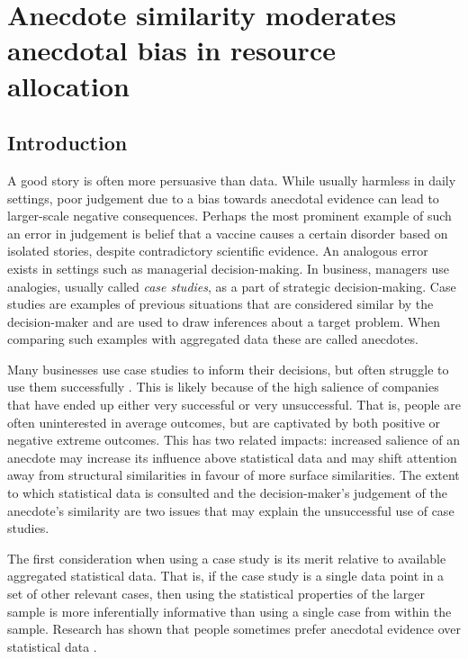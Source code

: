 \documentclass[a4paper, nobind, dvipsnames]{templates/ociamthesis}
\theoremstyle{definition}
\theoremstyle{definition}
\theoremstyle{definition}
\theoremstyle{definition}
\theoremstyle{remark}
\begin{document}
\hypertarget{anecdotes}{%
\chapter{Anecdote similarity moderates anecdotal bias in resource allocation}\label{anecdotes}}

\minitoc

\section{Introduction}

A good story is often more persuasive than data. While usually harmless in daily
settings, poor judgement due to a bias towards anecdotal evidence can lead to
larger-scale negative consequences. Perhaps the most prominent example of such
an error in judgement is belief that a vaccine causes a certain disorder based
on isolated stories, despite contradictory scientific evidence. An analogous
error exists in settings such as managerial decision-making. In business,
managers use analogies, usually called \emph{case studies}, as a part of strategic
decision-making. Case studies are examples of previous situations that are
considered similar by the decision-maker and are used to draw inferences about a
target problem. When comparing such examples with aggregated data these are
called anecdotes.

Many businesses use case studies to inform their decisions, but often struggle
to use them successfully \autocite{gavetti2005a}. This is likely because of the high
salience of companies that have ended up either very successful or very
unsuccessful. That is, people are often uninterested in average outcomes, but
are captivated by both positive or negative extreme outcomes. This has two
related impacts: increased salience of an anecdote may increase its influence
above statistical data and may shift attention away from structural similarities
in favour of more surface similarities. The extent to which statistical data is
consulted and the decision-maker's judgement of the anecdote's similarity are
two issues that may explain the unsuccessful use of case studies.

The first consideration when using a case study is its merit relative to
available aggregated statistical data. That is, if the case study is a single
data point in a set of other relevant cases, then using the statistical
properties of the larger sample is more inferentially informative than using a
single case from within the sample. Research has shown that people sometimes
prefer anecdotal evidence over statistical data \autocites[e.g.,][]{reinard1988,shen2015,jaramillo2019}.
\end{document}
